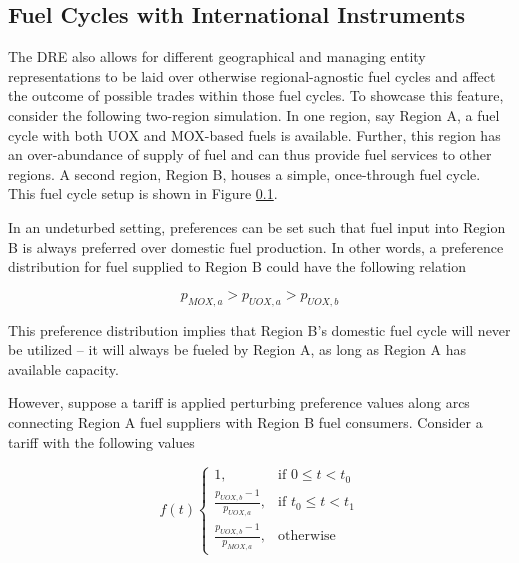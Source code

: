 





\subsection{Fuel Cycles with International Instruments}

The DRE also allows for different geographical and managing entity
representations to be laid over otherwise regional-agnostic fuel cycles and
affect the outcome of possible trades within those fuel cycles. To showcase this
feature, consider the following two-region simulation. In one region, say Region
A, a fuel cycle with both UOX and MOX-based fuels is available. Further, this
region has an over-abundance of supply of fuel and can thus provide fuel
services to other regions. A second region, Region B, houses a simple,
once-through fuel cycle. This fuel cycle setup is shown in Figure \ref{}.

In an undeturbed setting, preferences can be set such that fuel input into
Region B is always preferred over domestic fuel production. In other words, a
preference distribution for fuel supplied to Region B could have the following
relation

\begin{equation}
  p_{MOX, a} > p_{UOX, a} > p_{UOX, b}
\end{equation}

This preference distribution implies that Region B's domestic fuel cycle will
never be utilized -- it will always be fueled by Region A, as long as Region A
has available capacity.

However, suppose a tariff is applied perturbing preference values along arcs
connecting Region A fuel suppliers with Region B fuel consumers. Consider a
tariff with the following values

\begin{equation}
f(t)
\begin{cases}
1, & \text{if } 0 \leq t < t_0 \\
\frac{p_{UOX, b} - 1}{p_{UOX, a}}, & \text{if } t_0 \leq t < t_1 \\
\frac{p_{UOX, b} - 1}{p_{MOX, a}}, & \text{otherwise}
\end{cases} 
\end{equation}




